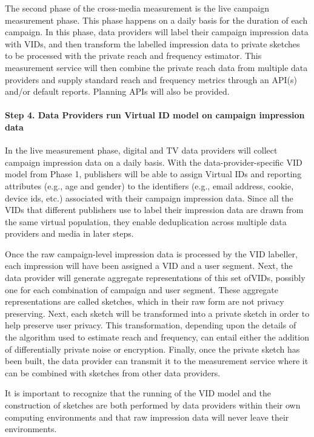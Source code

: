 \documentclass[]{article}
\let\oldparagraph\paragraph
\renewcommand{\paragraph}[1]{\oldparagraph{#1}\mbox{}}
\begin{document}
The second phase of the cross-media measurement is the live campaign measurement phase. This phase happens on a daily basis for the duration of each campaign. In this phase, data providers will label their
campaign impression data with VIDs, and then transform the labelled impression data to private sketches\\
to be processed with the private reach and frequency estimator. This measurement service will then combine the private reach data from multiple data providers and supply standard reach and frequency metrics through an API(s) and/or default reports. Planning APIs will also be provided.


\paragraph{Step 4. Data Providers run Virtual ID model on campaign impression data}

In the live measurement phase, digital and TV data providers will collect campaign impression data on a daily basis. With the data-provider-specific VID model from Phase 1, publishers will be able to assign Virtual IDs and reporting attributes (e.g., age and gender) to the identifiers (e.g., email address, cookie, device ids, etc.) associated with their campaign impression data. Since all the VIDs that different publishers use to label their impression data are drawn from the same virtual population, they enable deduplication across multiple data providers and media in later steps.

Once the raw campaign-level impression data is processed by the VID labeller, each impression will have been assigned a VID and a user segment. Next, the data provider will generate aggregate representations
of this set ofVIDs, possibly one for each combination of campaign and user segment. These aggregate representations are called sketches, which in their raw form are not privacy preserving. Next, each sketch will be transformed into a private sketch in order to help preserve user privacy. This transformation, depending upon the details of the algorithm used to estimate reach and frequency, can entail either the
addition of differentially private noise or encryption. Finally, once the private sketch has been built, the data provider can transmit it to the measurement service where it can be combined with sketches from other data providers.

It is important to recognize that the running of the VID model and the construction of sketches are both performed by data providers within their own computing environments and that raw impression data will never leave their environments.
\end{document}

